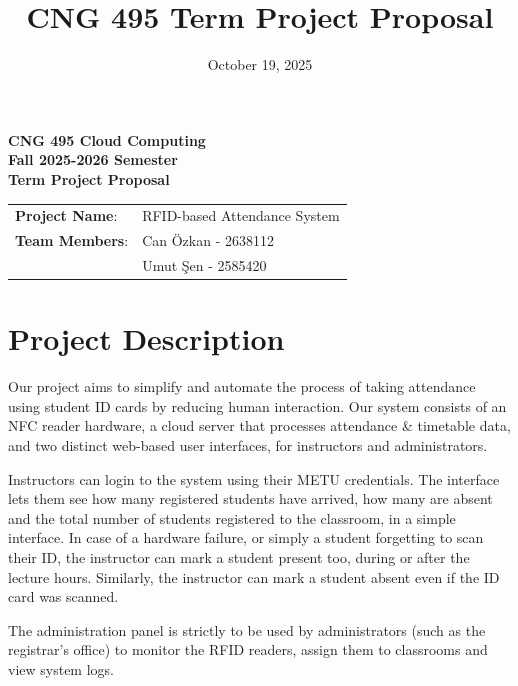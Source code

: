 \documentclass[12pt]{article}
\title{CNG 495 Term Project Proposal}
\date{October 19, 2025}
\begin{document}
\begin{titlepage}
    \begin{center}
        \Huge\bfseries CNG 495 Cloud Computing \\ Fall 2025-2026 Semester \\ Term Project Proposal
    \end{center}

    \vfill
    \vfill
    
    {
        \large
        \begin{tabular}{@{} l l @{}}
            \textbf{Project Name}: & RFID-based Attendance System \\
            \textbf{Team Members}: & Can Özkan  - 2638112 \\
                                   & Umut Şen - 2585420 \\
        \end{tabular}
    }

    \vfill
\end{titlepage}


\renewcommand{\contentsname}{Table of Contents} %
\tableofcontents
\listoffigures
\newpage



\section{Project Description}
Our project aims to simplify and automate the process of taking attendance using student ID cards by reducing human interaction. Our system consists of an NFC reader hardware, a cloud server that processes attendance \& timetable data, and two distinct web-based user interfaces, for instructors and administrators.\par

Instructors can login to the system using their METU credentials. The interface lets them see how many registered students have arrived, how many are absent and the total number of students registered to the classroom, in a simple interface. In case of a hardware failure, or simply a student forgetting to scan their ID, the instructor can mark a student present too, during or after the lecture hours. Similarly, the instructor can mark a student absent even if the ID card was scanned.\par

The administration panel is strictly to be used by administrators (such as the registrar's office) to monitor the RFID readers, assign them to classrooms and view system logs.\par
\end{document}
